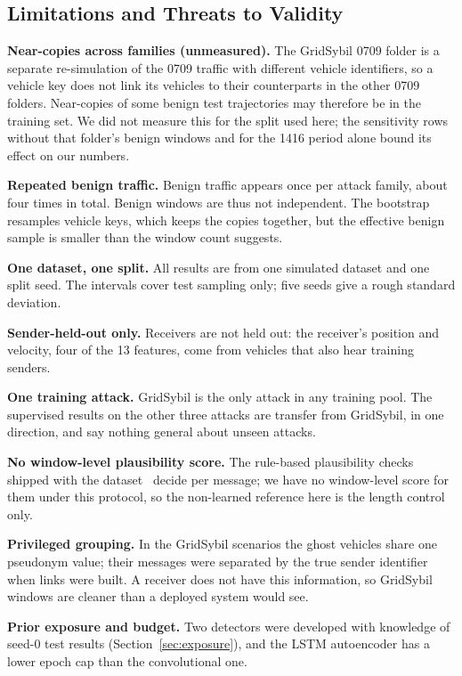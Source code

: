 \subsection{Limitations and Threats to Validity}\label{sec:limitations}

\textbf{Near-copies across families (unmeasured).} The GridSybil 0709 folder is a separate re-simulation of the
0709 traffic with different vehicle identifiers, so a vehicle key does not link its vehicles to their counterparts
in the other 0709 folders. Near-copies of some benign test trajectories may therefore be in the training set. We
did not measure this for the split used here; the sensitivity rows without that folder's benign windows and for
the 1416 period alone bound its effect on our numbers.

\textbf{Repeated benign traffic.} Benign traffic appears once per attack family, about four times in total.
Benign windows are thus not independent. The bootstrap resamples vehicle keys, which keeps the copies together,
but the effective benign sample is smaller than the window count suggests.

\textbf{One dataset, one split.} All results are from one simulated dataset and one split seed. The intervals
cover test sampling only; five seeds give a rough standard deviation.

\textbf{Sender-held-out only.} Receivers are not held out: the receiver's position and velocity, four of the 13
features, come from vehicles that also hear training senders.

\textbf{One training attack.} GridSybil is the only attack in any training pool. The supervised results on the
other three attacks are transfer from GridSybil, in one direction, and say nothing general about unseen attacks.

\textbf{No window-level plausibility score.} The rule-based plausibility checks shipped with the
dataset~\cite{kamel2020veremi,kamel2020simulation} decide per message; we have no window-level score for them
under this protocol, so the non-learned reference here is the length control only.

\textbf{Privileged grouping.} In the GridSybil scenarios the ghost vehicles share one pseudonym value; their
messages were separated by the true sender identifier when links were built. A receiver does not have this
information, so GridSybil windows are cleaner than a deployed system would see.

\textbf{Prior exposure and budget.} Two detectors were developed with knowledge of seed-0 test results
(Section~\ref{sec:exposure}), and the LSTM autoencoder has a lower epoch cap than the convolutional one.

